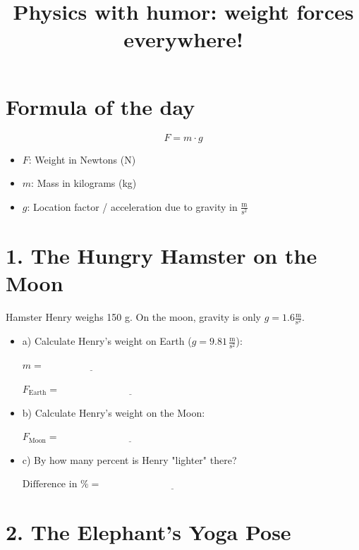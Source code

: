 \documentclass[a4paper,12pt]{article}
\title{Physics with humor: weight forces everywhere!}
\date{}
\begin{document}
	
	
	\section*{Formula of the day}
	
	\[
	F = m \cdot g
	\]
	\begin{itemize}
		\item \( F \): Weight in Newtons (N)
		\item \( m \): Mass in kilograms (kg)
		\item \( g \): Location factor / acceleration due to gravity in \( \frac{\text{m}}{\text{s}^2} \)
	\end{itemize}
	
	\hrulefill
	
	\section{1. The Hungry Hamster on the Moon }
	
	Hamster Henry weighs 150 g. On the moon, gravity is only \( g = 1.6 \frac{\text{m}}{\text{s}^2} \).
	
	\begin{itemize}
		\item a) Calculate Henry's weight on Earth (\( g = 9.81\, \frac{\text{m}}{\text{s}^2} \)):
		
		\vspace{1em}
		\( m = \underline{\hspace{4cm}} \)
		
		\( F_\text{Earth} = \underline{\hspace{6cm}} \)
		
		\item b) Calculate Henry's weight on the Moon:
		
		\vspace{1em}
		\( F_\text{Moon} = \underline{\hspace{6cm}} \)
		
		\item c) By how many percent is Henry "lighter" there?
		
		\vspace{1em}
		\( \text{Difference in \%} = \underline{\hspace{6cm}} \)
	\end{itemize}
	
	\hrulefill
	
	\section*{2. The Elephant's Yoga Pose }
	
\end{document}
